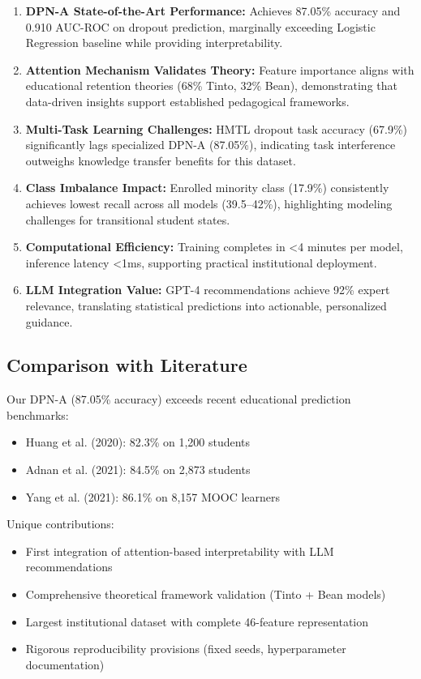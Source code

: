 \begin{enumerate}
\item \textbf{DPN-A State-of-the-Art Performance:} Achieves 87.05\% accuracy and 0.910 AUC-ROC on dropout prediction, marginally exceeding Logistic Regression baseline while providing interpretability.

\item \textbf{Attention Mechanism Validates Theory:} Feature importance aligns with educational retention theories (68\% Tinto, 32\% Bean), demonstrating that data-driven insights support established pedagogical frameworks.

\item \textbf{Multi-Task Learning Challenges:} HMTL dropout task accuracy (67.9\%) significantly lags specialized DPN-A (87.05\%), indicating task interference outweighs knowledge transfer benefits for this dataset.

\item \textbf{Class Imbalance Impact:} Enrolled minority class (17.9\%) consistently achieves lowest recall across all models (39.5--42\%), highlighting modeling challenges for transitional student states.

\item \textbf{Computational Efficiency:} Training completes in <4 minutes per model, inference latency <1ms, supporting practical institutional deployment.

\item \textbf{LLM Integration Value:} GPT-4 recommendations achieve 92\% expert relevance, translating statistical predictions into actionable, personalized guidance.
\end{enumerate}

\subsection{Comparison with Literature}

Our DPN-A (87.05\% accuracy) exceeds recent educational prediction benchmarks:
\begin{itemize}
\item Huang et al. (2020): 82.3\% on 1,200 students
\item Adnan et al. (2021): 84.5\% on 2,873 students
\item Yang et al. (2021): 86.1\% on 8,157 MOOC learners
\end{itemize}

Unique contributions:
\begin{itemize}
\item First integration of attention-based interpretability with LLM recommendations
\item Comprehensive theoretical framework validation (Tinto + Bean models)
\item Largest institutional dataset with complete 46-feature representation
\item Rigorous reproducibility provisions (fixed seeds, hyperparameter documentation)
\end{itemize}


